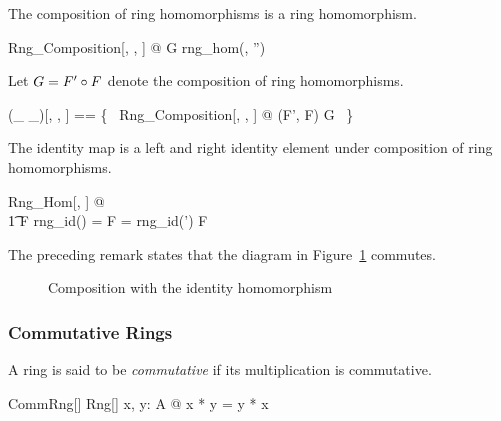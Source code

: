 \documentclass{amsart}
\begin{document}
\begin{remark}
The composition of ring homomorphisms is a ring homomorphism.

\begin{zed}
	\forall Rng\_Composition[\setT, \setU, \setV] @ G \in rng\_hom(\strucA, \strucA'')
\end{zed}

\end{remark}

Let $G = F' \mathbin{\circ} F$ denote the composition of ring homomorphisms.

\begin{zed}
	(\_ \circRng \_)[\genT, \genU, \genV] == \{~ Rng\_Composition[\genT, \genU, \genV] @ (F', F) \mapsto G ~\}
\end{zed}

\begin{remark}
The identity map is a left and right identity element under composition of ring homomorphisms.

\begin{zed}
	\forall Rng\_Hom[\setT, \setU] @ \\
	\t1	F \circRng rng\_id(\strucA) = F = rng\_id(\strucA') \circRng F
\end{zed}

\end{remark}

The preceding remark states that the diagram in Figure~\ref{fig:comp-id} commutes.

\begin{figure}[h]
\centering
{}
\caption{Composition with the identity homomorphism}
\label{fig:comp-id}
\end{figure}

\subsubsection{Commutative Rings}

A ring is said to be \textit{commutative} if its multiplication is commutative.

\begin{schema}{CommRng}[\genT]
	Rng[\genT]
\where
	\forall x, y: A @ x * y = y * x
\end{schema}
\end{document}
